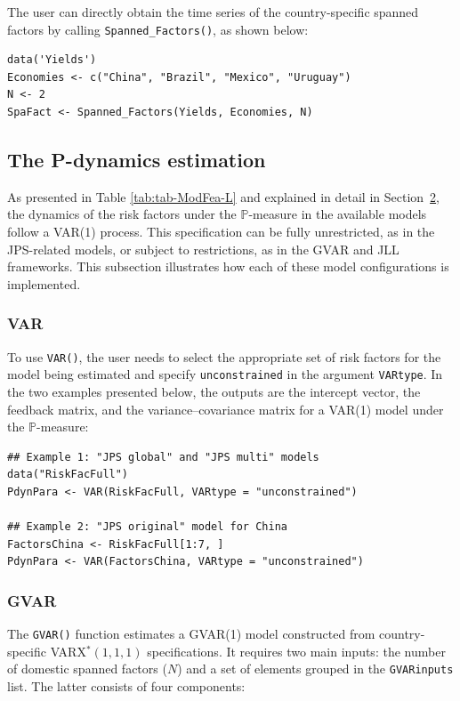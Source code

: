 The user can directly obtain the time series of the country-specific spanned factors by calling \texttt{Spanned\_Factors()}, as shown below:

\begin{verbatim}
data('Yields')
Economies <- c("China", "Brazil", "Mexico", "Uruguay")
N <- 2
SpaFact <- Spanned_Factors(Yields, Economies, N)
\end{verbatim}

\subsection{The P-dynamics estimation}\label{S:PdynEst}

As presented in Table \ref{tab:tab-ModFea-L} and explained in detail in Section~\hyperref[S:ATSMTheory]{2}, the dynamics of the risk factors under the \(\mathbb{P}\)-measure in the available models follow a VAR(1) process. This specification can be fully unrestricted, as in the JPS-related models, or subject to restrictions, as in the GVAR and JLL frameworks. This subsection illustrates how each of these model configurations is implemented.

\subsubsection{VAR}\label{S:SectionVAR}

To use \texttt{VAR()}, the user needs to select the appropriate set of risk factors for the model being estimated and specify \texttt{unconstrained} in the argument \texttt{VARtype}. In the two examples presented below, the outputs are the intercept vector, the feedback matrix, and the variance--covariance matrix for a VAR(1) model under the \(\mathbb{P}\)-measure:

\begin{verbatim}
## Example 1: "JPS global" and "JPS multi" models
data("RiskFacFull")
PdynPara <- VAR(RiskFacFull, VARtype = "unconstrained")

## Example 2: "JPS original" model for China
FactorsChina <- RiskFacFull[1:7, ]
PdynPara <- VAR(FactorsChina, VARtype = "unconstrained")
\end{verbatim}

\subsubsection{GVAR}\label{S:SectionGVAR}

The \texttt{GVAR()} function estimates a GVAR(1) model constructed from country-specific VARX\(^{*}(1,1,1)\) specifications. It requires two main inputs: the number of domestic spanned factors (\(N\)) and a set of elements grouped in the \texttt{GVARinputs} list. The latter consists of four components:

